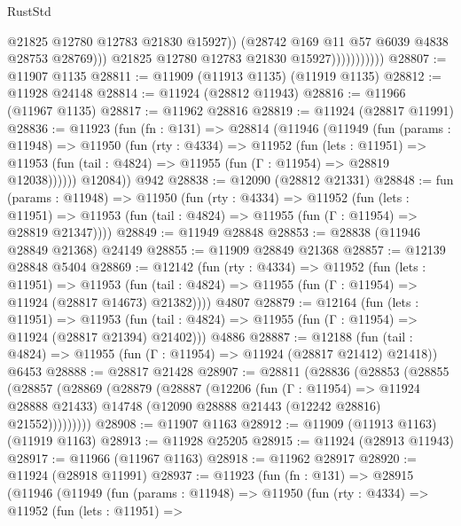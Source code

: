 \begin{lexlean}{RustStd}
\begin{coremodule}
{\begin{coremodule}
{{{{{{{{{{{{{{{{{{{{{{{{{{{{{{{{{{{{{{{{{{{{{{{{{{{{{{{{{{{{{{{{{{{{{{{{{{{{{{{{                                  @21825
                                  @12780
                                  @12783
                                  @21830
                                  @15927))
                              (@28742 @169 @11 @57 @6039 @4838 @28753 @28769)))
                          @21825
                          @12780
                          @12783
                          @21830
                          @15927)))))))))))
@28807 := @11907 @1135
@28811 := @11909 (@11913 @1135) (@11919 @1135)
@28812 := @11928 @24148
@28814 := @11924 (@28812 @11943)
@28816 := @11966 (@11967 @1135)
@28817 := @11962 @28816
@28819 := @11924 (@28817 @11991)
@28836 := @11923
    (fun (fn : @131) =>
    @28814
      (@11946
        (@11949
          (fun (params : @11948) =>
          @11950
            (fun (rty : @4334) =>
            @11952
              (fun (lets : @11951) =>
              @11953 (fun (tail : @4824) => @11955 (fun (Γ : @11954) => @28819 @12038))))))
        @12084))
    @942
@28838 := @12090 (@28812 @21331)
@28848 := fun (params : @11948) =>
  @11950
    (fun (rty : @4334) =>
    @11952
      (fun (lets : @11951) =>
      @11953 (fun (tail : @4824) => @11955 (fun (Γ : @11954) => @28819 @21347))))
@28849 := @11949 @28848
@28853 := @28838 (@11946 @28849 @21368) @24149
@28855 := @11909 @28849 @21368
@28857 := @12139 @28848 @5404
@28869 := @12142
    (fun (rty : @4334) =>
    @11952
      (fun (lets : @11951) =>
      @11953 (fun (tail : @4824) => @11955 (fun (Γ : @11954) => @11924 (@28817 @14673) @21382))))
    @4807
@28879 := @12164
    (fun (lets : @11951) =>
    @11953 (fun (tail : @4824) => @11955 (fun (Γ : @11954) => @11924 (@28817 @21394) @21402)))
    @4886
@28887 := @12188
    (fun (tail : @4824) => @11955 (fun (Γ : @11954) => @11924 (@28817 @21412) @21418))
    @6453
@28888 := @28817 @21428
@28907 := @28811
    (@28836
      (@28853
        (@28855
          (@28857
            (@28869
              (@28879
                (@28887
                  (@12206
                    (fun (Γ : @11954) => @11924 @28888 @21433)
                    @14748
                    (@12090 @28888 @21443 (@12242 @28816) @21552)))))))))
@28908 := @11907 @1163
@28912 := @11909 (@11913 @1163) (@11919 @1163)
@28913 := @11928 @25205
@28915 := @11924 (@28913 @11943)
@28917 := @11966 (@11967 @1163)
@28918 := @11962 @28917
@28920 := @11924 (@28918 @11991)
@28937 := @11923
    (fun (fn : @131) =>
    @28915
      (@11946
        (@11949
          (fun (params : @11948) =>
          @11950
            (fun (rty : @4334) =>
            @11952
              (fun (lets : @11951) =>
}}}}}}}}}}}}}}}}}}}}}}}}}}}}}}}}}}}}}}}}}}}}}}}}}}}}}}}}}}}}}}}}}}}}}}}}}}}}}}}}
\end{coremodule}}
\end{coremodule}
\end{lexlean}
